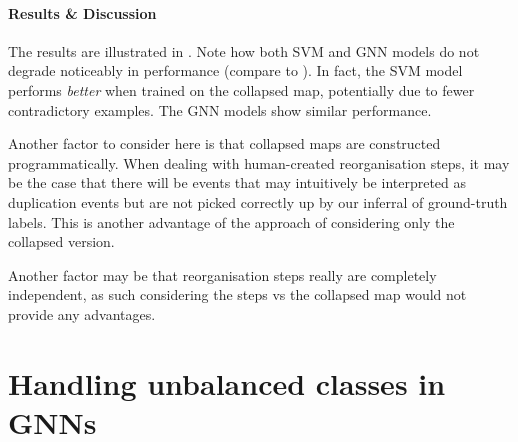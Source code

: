 \documentclass[
	fontsize=10pt, %
	twoside=false, %
	secnumdepth=1, %
  toc=indentunnumbered %
]{kaobook}
\begin{document}
\paragraph{Results \& Discussion} The results are illustrated in
. Note how both SVM and GNN models do
not degrade noticeably in performance (compare to ). In
fact, the SVM model performs \textit{better} when trained on the collapsed map,
potentially due to fewer contradictory examples. The GNN models show similar
performance.


Another factor to consider here is that collapsed maps are constructed
programmatically. When dealing with human-created reorganisation steps, it may
be the case that there will be events that may intuitively be interpreted as
duplication events but are not picked correctly up by our inferral of
ground-truth labels. This is another advantage of the approach of considering
only the collapsed version.

Another factor may be that reorganisation steps really are completely
independent, as such considering the steps vs the collapsed map would not
provide any advantages.








\section{Handling unbalanced classes in GNNs}
\end{document}
